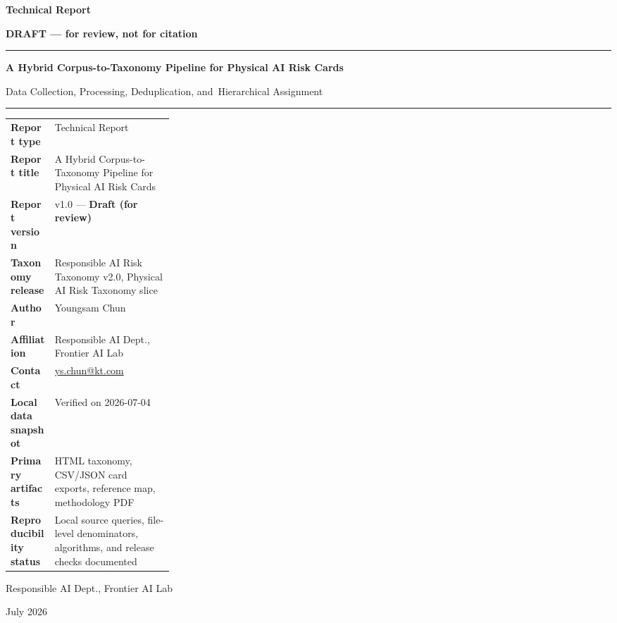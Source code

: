 \documentclass[11pt]{article}
\begin{document}
\begin{titlepage}
\thispagestyle{empty}
\vspace*{0.6in}
{\sffamily\bfseries\Large Technical Report\par}
\vspace{0.10in}
{\sffamily\bfseries\Large\color{red}DRAFT --- for review, not for citation\par}
\vspace{0.16in}
{\color{reportblue}\rule{\linewidth}{1.2pt}\par}
\vspace{0.28in}
{\sffamily\bfseries\Huge A Hybrid Corpus-to-Taxonomy Pipeline for Physical AI Risk Cards\par}
\vspace{0.16in}
{\sffamily\Large Data Collection, Processing, Deduplication, and\ Hierarchical Assignment\par}
\vspace{0.28in}
{\color{reportblue}\rule{\linewidth}{0.7pt}\par}
\vspace{0.5in}

\begin{tabularx}{\linewidth}{>{\bfseries}p{0.27\linewidth}X}
Report type & Technical Report \\
Report title & A Hybrid Corpus-to-Taxonomy Pipeline for Physical AI Risk Cards \\
Report version & v1.0 --- \textbf{Draft (for review)} \\
Taxonomy release & Responsible AI Risk Taxonomy v2.0, Physical AI Risk Taxonomy slice \\
Author & Youngsam Chun \\
Affiliation & Responsible AI Dept., Frontier AI Lab \\
Contact & \href{mailto:ys.chun@kt.com}{ys.chun@kt.com} \\
Local data snapshot & Verified on 2026-07-04 \\
Primary artifacts & HTML taxonomy, CSV/JSON card exports, reference map, methodology PDF \\
Reproducibility status & Local source queries, file-level denominators, algorithms, and release checks documented \\
\end{tabularx}

\vfill
{\sffamily Responsible AI Dept., Frontier AI Lab\par}
{\sffamily July 2026\par}
\end{titlepage}
\end{document}
